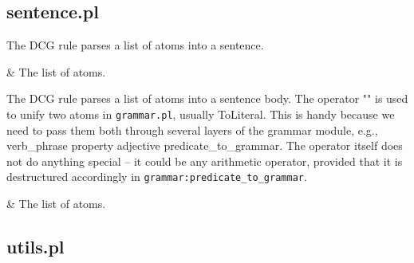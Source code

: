\subsection{sentence.pl}

\label{sec:sentence}

\begin{description}
The  DCG rule parses a list of atoms into a sentence.

\begin{arguments}
 & The list of atoms. \\
\end{arguments}

The  DCG rule parses a list of atoms into a sentence body.
The operator "\Sssu{}" is used to unify two atoms in \verb$grammar.pl$, usually ToLiteral.
This is handy because we need to pass them both through several layers of the grammar module,
e.g., verb_phrase \Sifthen{} property \Sifthen{} adjective \Sifthen{} predicate_to_grammar.
The operator itself does not do anything special -- it could be any arithmetic operator,
provided that it is destructured accordingly in \verb$grammar:predicate_to_grammar$.

\begin{arguments}
 & The list of atoms. \\
\end{arguments}
\end{description}

\subsection{utils.pl}

\label{sec:utils}

